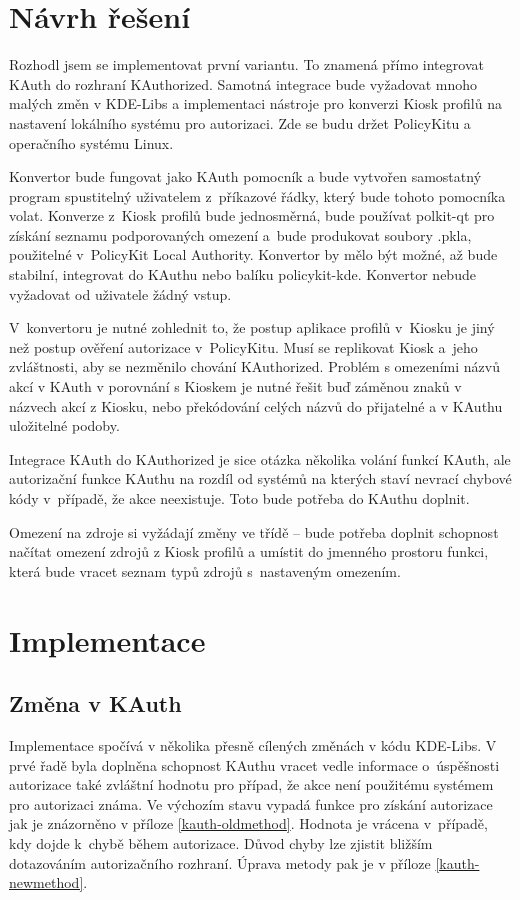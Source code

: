 \section{Návrh řešení}\label{mozres}
Rozhodl jsem se implementovat první variantu. To znamená přímo integrovat KAuth do rozhraní KAuthorized. Samotná integrace bude vyžadovat mnoho malých změn v KDE-Libs a implementaci nástroje pro konverzi Kiosk profilů na nastavení lokálního systému pro autorizaci. Zde se budu držet PolicyKitu a operačního systému Linux.

Konvertor bude fungovat jako KAuth pomocník a bude vytvořen samostatný program spustitelný uživatelem z~příkazové řádky, který bude tohoto pomocníka volat. Konverze z~Kiosk profilů bude jednosměrná, bude používat polkit-qt pro získání seznamu podporovaných omezení a~bude produkovat soubory .pkla, použitelné v~PolicyKit Local Authority. Konvertor by mělo být možné, až bude stabilní, integrovat do KAuthu nebo balíku policykit-kde. Konvertor nebude vyžadovat od uživatele žádný vstup.

V~konvertoru je nutné zohlednit to, že postup aplikace profilů v~Kiosku je jiný než postup ověření autorizace v~PolicyKitu. Musí se replikovat Kiosk a~jeho zvláštnosti, aby se nezměnilo chování KAuthorized. Problém s omezeními názvů akcí v KAuth v porovnání s Kioskem je nutné řešit buď záměnou znaků v názvech akcí z Kiosku, nebo překódování celých názvů do přijatelné a v KAuthu uložitelné podoby.

Integrace KAuth do KAuthorized je sice otázka několika volání funkcí KAuth, ale autorizační funkce KAuthu na rozdíl od systémů na kterých staví nevrací chybové kódy v~případě, že akce neexistuje. Toto bude potřeba do KAuthu doplnit.

Omezení na zdroje  si vyžádají změny ve třídě  -- bude potřeba doplnit schopnost načítat omezení zdrojů z Kiosk profilů a umístit do jmenného prostoru  funkci, která bude vracet seznam typů zdrojů s~nastaveným omezením.

\section{Implementace}
\subsection*{Změna v KAuth}
Implementace spočívá v několika přesně cílených změnách v kódu KDE-Libs. V prvé řadě byla doplněna schopnost KAuthu vracet vedle informace o~úspěšnosti autorizace také zvláštní hodnotu pro případ, že akce není použitému systémem pro autorizaci známa. Ve výchozím stavu vypadá funkce pro získání autorizace jak je znázorněno v příloze \ref{kauth-oldmethod}. Hodnota  je vrácena v~případě, kdy dojde k~chybě během autorizace. Důvod chyby lze zjistit bližším dotazováním autorizačního rozhraní. Úprava metody pak je v příloze \ref{kauth-newmethod}.


